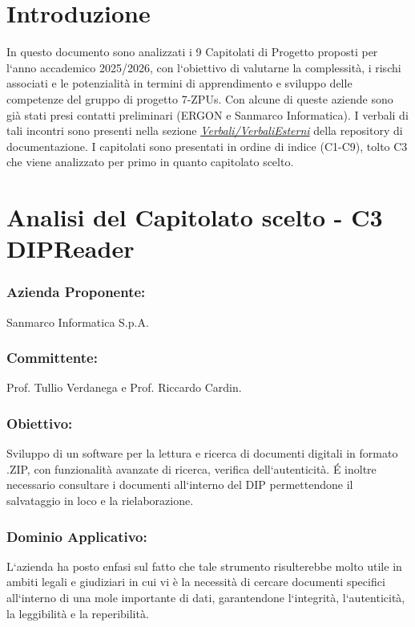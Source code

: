 \documentclass[a4paper,12pt]{article}
\begin{document}
\section{Introduzione}
In questo documento sono analizzati i 9 Capitolati di Progetto proposti per
l`anno accademico 2025/2026, con l`obiettivo di valutarne la complessità, i
rischi associati e le potenzialità in termini di apprendimento e sviluppo delle
competenze del gruppo di progetto 7-ZPUs. Con alcune di queste aziende sono già
stati presi contatti preliminari (ERGON e Sanmarco Informatica). I verbali di
tali incontri sono presenti nella sezione
\href{https://github.com/7-ZPUs/Docs/tree/main/1_Candidatura/Verbali/Verbali\%20Esterni}{\textit{Verbali/VerbaliEsterni}} della repository di documentazione. 
I capitolati sono presentati in ordine di indice (C1-C9), tolto C3 che viene analizzato per primo in quanto capitolato scelto.

\section{Analisi del Capitolato scelto - C3 DIPReader}
\subsubsection*{Azienda Proponente:} Sanmarco Informatica S.p.A.
\subsubsection*{Committente:} Prof. Tullio Verdanega e Prof. Riccardo Cardin.
\subsubsection*{Obiettivo:} Sviluppo di un software per la lettura e ricerca di documenti digitali in formato .ZIP, con funzionalità avanzate di ricerca, verifica dell`autenticità. É inoltre necessario consultare i documenti all`interno del DIP permettendone il salvataggio in loco e la rielaborazione.
\subsubsection*{Dominio Applicativo:} L`azienda ha posto enfasi sul fatto che tale strumento risulterebbe molto utile in ambiti legali e giudiziari in cui vi è la necessità di cercare documenti specifici all`interno di una mole importante di dati, garantendone l`integrità, l`autenticità, la leggibilità  e la reperibilità.
\end{document}
